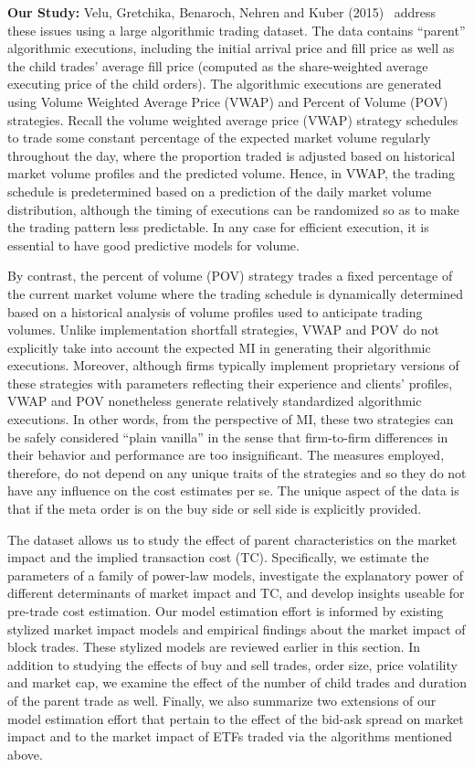 \noindent\textbf{Our Study:} Velu, Gretchika, Benaroch, Nehren and Kuber (2015)~\cite{unpub} address these issues using a large algorithmic trading dataset. The data contains ``parent'' algorithmic executions, including the initial arrival price and fill price as well as the child trades' average fill price (computed as the share-weighted average executing price of the child orders). The algorithmic executions are generated using Volume Weighted Average Price (VWAP) and Percent of Volume (POV) strategies.\label{in:pov1} Recall the volume weighted average price (VWAP) strategy schedules to trade some constant percentage of the expected market volume regularly throughout the day, where the proportion traded is adjusted based on historical market volume profiles and the predicted volume. Hence, in VWAP, the trading schedule is predetermined based on a prediction of the daily market volume distribution, although the timing of executions can be randomized so as to make the trading pattern less predictable. In any case for efficient execution, it is essential to have good predictive models for volume. 


By contrast, the percent of volume (POV) strategy trades a fixed percentage of the current market volume where the trading schedule is dynamically determined based on a historical analysis of volume profiles used to anticipate trading volumes. Unlike implementation shortfall strategies, VWAP and POV do not explicitly take into account the expected MI in generating their algorithmic executions. Moreover, although firms typically implement proprietary versions of these strategies with parameters reflecting their experience and clients' profiles, VWAP and POV nonetheless generate relatively standardized algorithmic executions. In other words, from the perspective of MI, these two strategies can be safely considered ``plain vanilla'' in the sense that firm-to-firm differences in their behavior and performance are too insignificant. The measures employed, therefore, do not depend on any unique traits of the strategies and so they do not have any influence on the cost estimates per se. The unique aspect of the data is that if the meta order is on the buy side or sell side is explicitly provided. 


The dataset allows us to study the effect of parent characteristics on the market impact and the implied transaction cost (TC). Specifically, we estimate the parameters of a family of power-law models, investigate the explanatory power of different determinants of market impact and TC, and develop insights useable for pre-trade cost estimation. Our model estimation effort is informed by existing stylized market impact models and empirical findings about the market impact of block trades. These stylized models are reviewed earlier in this section. In addition to studying the effects of buy and sell trades, order size, price volatility and market cap, we examine the effect of the number of child trades and duration of the parent trade as well. Finally, we also summarize two extensions of our model estimation effort that pertain to the effect of the bid-ask spread on market impact and to the market impact of ETFs traded via the algorithms mentioned above.



